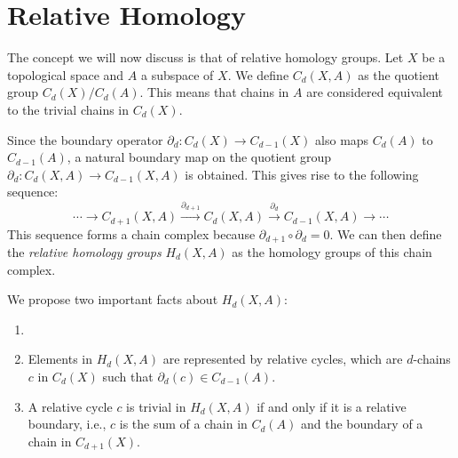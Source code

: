 \section{Relative Homology}
\label{Relative Homology} The concept we will now discuss is that of relative
homology groups. Let $X$ be a topological space and $A$ a subspace of $X$. We
define $C_{d}(X,A)$ as the quotient group $C_{d}(X)/C_{d}(A)$. This means that chains
in $A$ are considered equivalent to the trivial chains in $C_{d}(X)$.

Since the boundary operator $\partial_{d}: C_{d}(X) \rightarrow C_{d-1}(X)$ also
maps $C_{d}(A)$ to $C_{d-1}(A)$, a natural boundary map on the quotient group
$\partial_{d}: C_{d}(X,A) \rightarrow C_{d-1}(X,A)$ is obtained. This gives rise
to the following sequence:
\begin{equation}
	\cdots \xrightarrow{}C_{d+1}(X,A) \xrightarrow{\partial_{d+1}}C_{d}(X,A) \xrightarrow
	{\partial_d}C_{d-1}(X,A) \xrightarrow{}\cdots
\end{equation}
This sequence forms a chain complex because
$\partial_{d+1}\circ \partial_{d}= 0$. We can then define the \emph{relative
homology groups} $H_{d}(X,A)$ as the homology groups of this chain complex.

We propose two important facts about $H_{d}(X,A)$:

\begin{proposition}
	\begin{enumerate}
		\item[]

		\item Elements in $H_{d}(X,A)$ are represented by relative cycles, which are
			$d$-chains $c$ in $C_{d}(X)$ such that $\partial_{d}(c) \in C_{d-1}(A)$.

		\item A relative cycle $c$ is trivial in $H_{d}(X,A)$ if and only if it is a
			relative boundary, i.e., $c$ is the sum of a chain in $C_{d}(A)$ and the
			boundary of a chain in $C_{d+1}(X)$.
	\end{enumerate}
\end{proposition}


